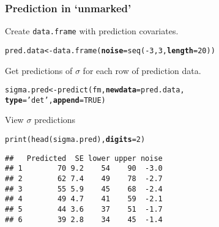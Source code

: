 \documentclass[color=usenames,dvipsnames]{beamer}\usepackage[]{graphicx}\usepackage[]{color}
\makeatletter
\newcommand{\hlnum}[1]{\textcolor[rgb]{0.69,0.494,0}{#1}}%
\newcommand{\hlstr}[1]{\textcolor[rgb]{0.749,0.012,0.012}{#1}}%
\newcommand{\hlopt}[1]{\textcolor[rgb]{0,0,0}{#1}}%
\newcommand{\hlstd}[1]{\textcolor[rgb]{0,0,0}{#1}}%
\newcommand{\hlkwb}[1]{\textcolor[rgb]{0,0.341,0.682}{#1}}%
\newcommand{\hlkwc}[1]{\textcolor[rgb]{0,0,0}{\textbf{#1}}}%
\newcommand{\hlkwd}[1]{\textcolor[rgb]{0.004,0.004,0.506}{#1}}%
\newenvironment{kframe}{%
 \def\at@end@of@kframe{}%
 \ifinner\ifhmode%
  \def\at@end@of@kframe{\end{minipage}}%
  \begin{minipage}{\columnwidth}%
 \fi\fi%
 \def\FrameCommand##1{\hskip\@totalleftmargin \hskip-\fboxsep
 \colorbox{shadecolor}{##1}\hskip-\fboxsep
     \hskip-\linewidth \hskip-\@totalleftmargin \hskip\columnwidth}%
 \MakeFramed {\advance\hsize-\width
   \@totalleftmargin\z@ \linewidth\hsize
   \@setminipage}}%
 {\par\unskip\endMakeFramed%
 \at@end@of@kframe}
\newenvironment{knitrout}{}{} %
\makeatother
\begin{document}
\begin{frame}[fragile]
  \frametitle{Prediction in `unmarked'}
  \small
  Create \texttt{data.frame} with prediction covariates. 
  \vspace{-6pt}
\begin{knitrout}\footnotesize
{}\color{fgcolor}\begin{kframe}
\begin{alltt}
\hlstd{pred.data} \hlkwb{<-} \hlkwd{data.frame}\hlstd{(}\hlkwc{noise}\hlstd{=}\hlkwd{seq}\hlstd{(}\hlopt{-}\hlnum{3}\hlstd{,} \hlnum{3}\hlstd{,} \hlkwc{length}\hlstd{=}\hlnum{20}\hlstd{))}
\end{alltt}
\end{kframe}
\end{knitrout}
\pause
\vfill
Get predictions of $\sigma$ for each row of prediction data.
  \vspace{-6pt}
\begin{knitrout}\footnotesize
{}\color{fgcolor}\begin{kframe}
\begin{alltt}
\hlstd{sigma.pred} \hlkwb{<-} \hlkwd{predict}\hlstd{(fm,} \hlkwc{newdata}\hlstd{=pred.data,}
                      \hlkwc{type}\hlstd{=}\hlstr{'det'}\hlstd{,} \hlkwc{append}\hlstd{=}\hlnum{TRUE}\hlstd{)}
\end{alltt}
\end{kframe}
\end{knitrout}
\pause
\vfill
  View $\sigma$ predictions
  \vspace{-6pt}
\begin{knitrout}\footnotesize
{}\color{fgcolor}\begin{kframe}
\begin{alltt}
\hlkwd{print}\hlstd{(}\hlkwd{head}\hlstd{(sigma.pred),} \hlkwc{digits}\hlstd{=}\hlnum{2}\hlstd{)}
\end{alltt}
\begin{verbatim}
##   Predicted  SE lower upper noise
## 1        70 9.2    54    90  -3.0
## 2        62 7.4    49    78  -2.7
## 3        55 5.9    45    68  -2.4
## 4        49 4.7    41    59  -2.1
## 5        44 3.6    37    51  -1.7
## 6        39 2.8    34    45  -1.4
\end{verbatim}
\end{kframe}
\end{knitrout}
\end{frame}
\end{document}

